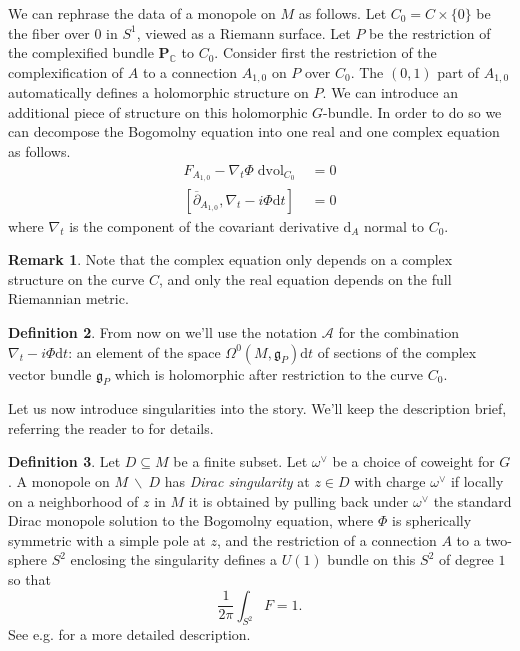 \documentclass[11pt, oneside, reqno]{amsart}
\theoremstyle{definition} \newtheorem{definition}{Definition}[section]
\theoremstyle{definition} \newtheorem{remark}[definition]{Remark}
\theoremstyle{definition} \newtheorem{remarks}[definition]{Remarks}
\theoremstyle{definition} \newtheorem{question}[definition]{Question}
\theoremstyle{definition} \newtheorem*{note}{Note}
\theoremstyle{definition} \newtheorem{example}[definition]{Example}
\theoremstyle{definition} \newtheorem{examples}[definition]{Examples}
\renewcommand{\gg}{\mathfrak{g}}
\newcommand{\mc}[1]{\mathcal{#1}}
\newcommand{\bo}[1]{\boldsymbol{#1}}
\newcommand{\bs}{\ \backslash \ }
\newcommand{\del}{\partial}
\newcommand{\ol}[1]{\overline{#1}}
\newcommand{\CC}{\mathbb{C}}
\newcommand{\sub}{\subseteq}
\DeclareMathOperator{\dvol}{dvol}
\renewcommand{\d}{\mathrm{d}}
\begin{document}
We can rephrase the data of a monopole on $M$ as follows.  Let $C_0 = C \times \{0\}$ be the fiber over $0$ in $S^1$, viewed as a Riemann surface.  Let $P$ be the restriction of the complexified bundle $\bo P_\CC$ to $C_0$.  Consider first the restriction of the complexification of $A$ to a connection $A_{1,0}$ on $P$ over $C_0$.  The $(0,1)$ part of $A_{1,0}$ automatically defines a holomorphic structure on $P$.  We can introduce an additional piece of structure on this holomorphic $G$-bundle.  In order to do so we can decompose the Bogomolny equation into one real and one complex equation as follows.
\begin{align}
F_{A_{1,0}} - \nabla_t \Phi \dvol_{C_0} &= 0 \label{Bogomolny_equation_real} \\
[\ol{\del}_{A_{1,0}}, \nabla_t - i\Phi \d t] &= 0 \label{Bogomolny_equation_complex}
\end{align}
where $\nabla_t$ is the component of the covariant derivative $\d_A$ normal to $C_0$.  

\begin{remark}
Note that the complex equation only depends on a complex structure on the curve $C$, and only the real equation depends on the full Riemannian metric.
\end{remark}

\begin{definition} 
From now on we'll use the notation $\mc A$ for the combination $\nabla_t - i\Phi \d t$: an element of the space $\Omega^0(M, \gg_P)\d t$ of sections of the complex vector bundle $\gg_P$ which is holomorphic after restriction to the curve $C_0$. 
\end{definition}

Let us now introduce singularities into the story.  We'll keep the description brief, referring the reader to \cite{CharbonneauHurtubise, Smith} for details.
\begin{definition}
Let $D \sub M$ be a finite subset.  Let $\omega^\vee$ be a choice of coweight for $G$.  A monopole on $M \bs D$ has \emph{Dirac singularity} at $z \in D$ with charge $\omega^\vee$ if locally on a neighborhood of $z$ in $M$ it is obtained by pulling back under $\omega^\vee$ the standard Dirac monopole solution to the Bogomolny equation, where $\Phi$ is spherically symmetric with a simple pole at $z$, and the restriction of a connection $A$ to a two-sphere $S^2$ enclosing the singularity defines a $U(1)$ bundle on this $S^2$ of degree $1$ so that
    \[\frac{1}{2\pi} \int_{S^2} F = 1 .\]
  See e.g. \cite[Section 2.2]{CharbonneauHurtubise} for a more detailed description.
\end{definition}
\end{document}
